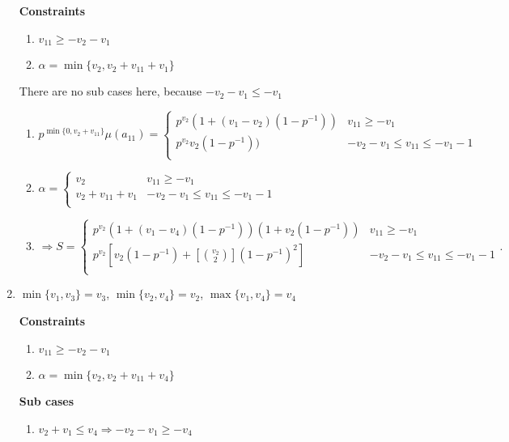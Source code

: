 \documentclass{article}
\begin{document}
\begin{enumerate}
    \textbf{Constraints}
    \begin{enumerate}
        \item $v_{11}\geq{-v_2-v_1}$
        \item $\alpha=\min\{v_2,v_2+v_{11}+v_1\}$
    \end{enumerate}
There are no sub cases here, because $-v_2-v_1\leq{-v_1}$
        \begin{enumerate}
            \item $p^{\min\{0,v_2+v_{11}\}}\mu(a_{11})=
            \left\{
	\begin{array}{ll}
            p^{v_2}(1+(v_1-v_2)(1-p^{-1})) & v_{11}\geq{-v_1} \\
		  p^{v_2}v_2(1-p^{-1})) & -v_2-v_1\leq{v_{11}}\leq{-v_1-1} \\
	\end{array}
\right.
$
            \item $\alpha=\left\{
	\begin{array}{ll}
            v_2  & v_{11}\geq{-v_1} \\
		  v_2+v_{11}+v_1 & -v_2-v_1\leq{v_{11}}\leq{-v_1-1} \\
	\end{array}
\right.$
        \item $\Rightarrow{S=\left\{
	\begin{array}{ll}
            p^{v_2}(1+(v_1-v_4)(1-p^{-1}))(1+v_2(1-p^{-1}))  & v_{11}\geq{-v_1} \\
		              p^{v_2}[v_2(1-p^{-1})+[\binom{v_2}{2}](1-p^{-1})^2]  & -v_2-v_1\leq{v_{11}}\leq{-v_1-1} \\
	\end{array}
\right.}.$
        \end{enumerate}

    \item $\min\{v_1,v_3\}=v_3$, $\min\{v_2,v_4\}=v_2$, $\max\{v_1,v_4\}=v_4$
    
    \textbf{Constraints}
    \begin{enumerate}
        \item $v_{11}\geq{-v_2-v_1}$
        \item $\alpha=\min\{v_2,v_2+v_{11}+v_4\}$
    \end{enumerate}
    
    \textbf{Sub cases}
    \begin{enumerate}
        \item $v_2+v_1\leq{v_4}\Rightarrow{-v_2-v_1\geq{-v_4}}$


\end{enumerate}
\end{enumerate}
\end{document}
